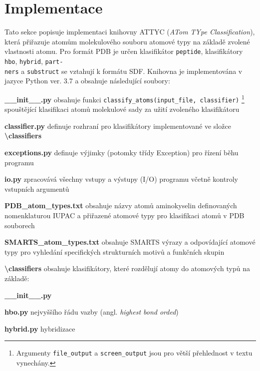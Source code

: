 \chapter{Implementace}
Tato sekce popisuje implementaci knihovny ATTYC (\textit{ATom TYpe Classification}), která přiřazuje atomům molekulového souboru atomové typy na základě zvolené vlastnosti atomu. Pro formát PDB je určen klasifikátor \verb|peptide|, klasifikátory \verb|hbo|, \verb|hybrid|, \verb|part-|\\\verb|ners| a \verb|substruct| se vztahují k formátu  SDF. Knihovna je implementována v jazyce Python ver. 3.7 a obsahuje následující soubory:

\vspace{0.4cm}
\noindent {} \textbf{\_\_init\_\_.py} obsahuje funkci \verb|classify_atoms(input_file, classifier)|
\footnote{Argumenty \texttt{file\_output} a \texttt{screen\_output} jsou pro větší přehlednost v textu vynechány.}
spouštějící klasifikaci atomů molekulové sady za uži\-tí zvoleného klasifikátoru

\medskip
\noindent \textbf{classifier.py} definuje rozhraní pro klasifikátory implementované ve složce \textbf{\textbackslash classifiers}

\medskip
\noindent \textbf{exceptions.py} definuje výjimky (potomky třídy Exception) pro řízení běhu programu

\medskip
\noindent {}\textbf{io.py} zpracovává všechny vstupy a výstupy (I/O) programu včetně kontroly vstupních argumentů 

\medskip
\noindent {}\textbf{PDB\_atom\_types.txt} obsahuje názvy atomů aminokyselin definovaných nomenklaturou IUPAC a přiřazené atomové typy pro klasifikaci atomů v PDB souborech

\medskip
\noindent {}\textbf{SMARTS\_atom\_types.txt} obsahuje SMARTS výrazy a odpovídající atomové typy pro vyhledání specifických strukturních motivů a funkčních skupin 

\medskip
\noindent\textbf{\textbackslash classifiers} obsahuje klasifikátory, které rozdělují atomy do atomových typů na základě:

\medskip
\textbf{\_\_init\_\_.py}

\vspace{0.01cm}
\textbf{hbo.py} nejvyššího řádu vazby (angl. \textit{highest bond orded})

\vspace{0.01cm}
\textbf{hybrid.py} hybridizace

